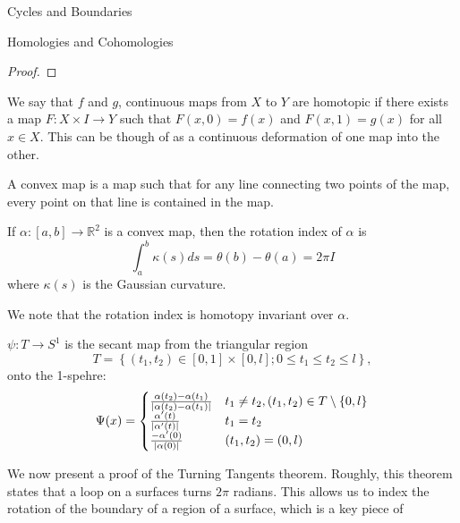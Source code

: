 \begin{subsubsection}{Cycles and Boundaries}
\begin{subsubsection}{Homologies and Cohomologies}
\begin{proof}
\rightline{\blacksquare}
\end{proof}
\begin{definition}
  We say that $f$ and $g$, continuous maps from $X$ to $Y$ are homotopic if
  there exists a map $F:X\times I\rightarrow Y$ such that $F(x,0) = f(x)$ and 
  $F(x,1) = g(x)$ for all $x\in X$. This can be though of as a continuous
  deformation of one map into the other.
\end{definition}
\begin{definition}
  A convex map is a map such that for any line connecting two points of the
  map, every point on that line is contained in the map.
\end{definition}
\begin{definition}
  If $\alpha:\left[a,b\right]\rightarrow \mathbb{R}^2$ is a convex map, then
  the rotation index of $\alpha$ is
  \begin{equation}
    \int_a^b{\kappa(s)ds} = \theta(b)-\theta(a) = 2\pi I
  \end{equation}
  where $\kappa(s)$ is the Gaussian curvature.
\end{definition}
\begin{remark}
  We note that the rotation index is homotopy invariant over $\alpha$.
\end{remark}
\begin{definition}
$\psi:T\rightarrow S^1$ is the secant map from the triangular region
\begin{equation}
  T=\left\{(t_1,t_2)\in\left[0,1\right]\times\left[0,l\right];0\leq t_1\leq
  t_2\leq l\right\},
\end{equation}
onto the 1-spehre:
\begin{equation}
  \Psi(x)=
  \begin{cases}
    \frac{\alpha(t_2)-\alpha(t_1)}{\abs{\alpha(t_2)-\alpha(t_1)}}& t_1\neq
    t_2, (t_1,t_2)\in T\setminus \left\{0,l\right\}\\
      \frac{\alpha'(t)}{\abs{\alpha'(t)}} &  t_1=t_2\\
      \frac{-\alpha'(0)}{\abs{\alpha(0)}} & (t_1,t_2)=(0,l)
  \end{cases}
\end{equation}
\end{definition}
We now present a proof of the Turning Tangents theorem. Roughly, this theorem
states that a loop on a surfaces turns $2\pi$ radians. This allows us to index
the rotation of the boundary of a region of a surface, which is a key piece of

\end{subsubsection}
\end{subsubsection}
